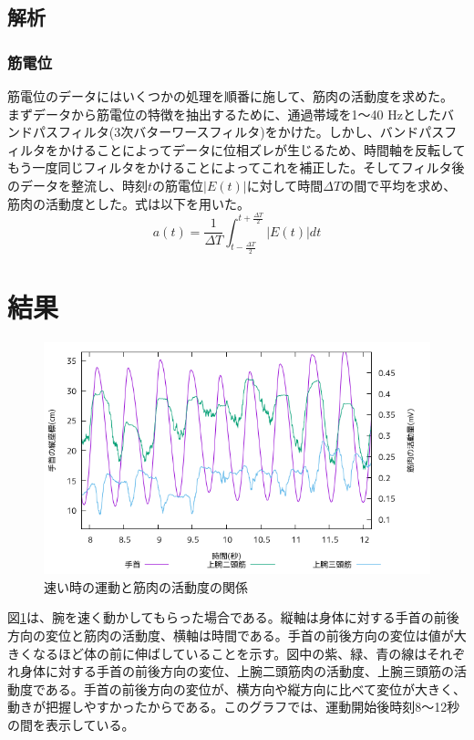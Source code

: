 \documentclass{jsarticle}
\begin{document}
\subsection{解析}
\subsubsection{筋電位}
筋電位のデータにはいくつかの処理を順番に施して、筋肉の活動度を求めた。
  まずデータから筋電位の特徴を抽出するために、通過帯域を1〜40 Hzとしたバンドパスフィルタ(3次バターワースフィルタ)をかけた。しかし、バンドパスフィルタをかけることによってデータに位相ズレが生じるため、時間軸を反転してもう一度同じフィルタをかけることによってこれを補正した。そしてフィルタ後のデータを整流し、時刻$t$の筋電位$|E(t)|$に対して時間$\Delta T$の間で平均を求め、筋肉の活動度とした。式は以下を用いた。
  \begin{equation}
    a(t) = \frac{1}{\Delta T} \int_{t-\frac{\Delta T}{2}}^{t+\frac{\Delta T}{2}} |E(t)| dt
  \end{equation}

\section{結果}
\begin{figure}[b]
  \begin{center}
    \includegraphics[width=15cm]{images/s2proto.png}
  \end{center}
  \caption{速い時の運動と筋肉の活動度の関係}
  \label{fig:fast}
\end{figure}
図\ref{fig:fast}は、腕を速く動かしてもらった場合である。縦軸は身体に対する手首の前後方向の変位と筋肉の活動度、横軸は時間である。手首の前後方向の変位は値が大きくなるほど体の前に伸ばしていることを示す。図中の紫、緑、青の線はそれぞれ身体に対する手首の前後方向の変位、上腕二頭筋肉の活動度、上腕三頭筋の活動度である。手首の前後方向の変位が、横方向や縦方向に比べて変位が大きく、動きが把握しやすかったからである。このグラフでは、運動開始後時刻8〜12秒の間を表示している。
\end{document}
